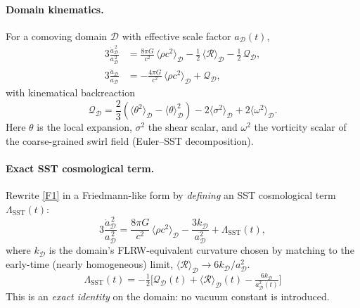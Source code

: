 \documentclass[reprint,aps,onecolumn,nofootinbib]{revtex4-2}
\begin{document}
    \paragraph{Domain kinematics.}
        For a comoving domain $\mathcal{D}$ with effective scale factor $a_\mathcal{D}(t)$,
        \begin{align}
        3\frac{\dot a_\mathcal{D}^{\,2}}{a_\mathcal{D}^{\,2}}
        &= \frac{8\pi G}{c^2}\,\langle \rho c^2 \rangle_\mathcal{D}
        - \tfrac{1}{2}\,\langle \mathcal{R} \rangle_\mathcal{D}
        - \tfrac{1}{2}\,\mathcal{Q}_\mathcal{D}, \tag{F1}\label{F1}\\
        3\frac{\ddot a_\mathcal{D}}{a_\mathcal{D}}
        &= -\frac{4\pi G}{c^2}\,\langle \rho c^2 \rangle_\mathcal{D}
        + \mathcal{Q}_\mathcal{D}, \tag{F2}\label{F2}
        \end{align}
        with kinematical backreaction
        \[
            \mathcal{Q}_\mathcal{D}
            = \frac{2}{3}\!\left(\langle \theta^{2}\rangle_\mathcal{D}-\langle \theta\rangle_\mathcal{D}^{2}\right)
            - 2\langle \sigma^{2}\rangle_\mathcal{D}
            + 2\langle \omega^{2}\rangle_\mathcal{D}.
        \]
        Here $\theta$ is the local expansion, $\sigma^2$ the shear scalar, and $\omega^2$ the vorticity scalar of the coarse-grained swirl field (Euler–SST decomposition).

    \paragraph{Exact SST cosmological term.}
        Rewrite \eqref{F1} in a Friedmann-like form by \emph{defining} an SST cosmological term $\Lambda_{\!\mathrm{SST}}(t)$:
        \[
            3\frac{\dot a_\mathcal{D}^{\,2}}{a_\mathcal{D}^{\,2}}
            = \frac{8\pi G}{c^2}\,\langle \rho c^2 \rangle_\mathcal{D}
            - \frac{3k_\mathcal{D}}{a_\mathcal{D}^{2}}
            + \Lambda_{\!\mathrm{SST}}(t),
        \]
        where $k_\mathcal{D}$ is the domain’s FLRW-equivalent curvature chosen by matching to the early-time (nearly homogeneous) limit, $\langle \mathcal{R} \rangle_\mathcal{D}\to 6k_\mathcal{D}/a_\mathcal{D}^2$.
        \[
            \boxed{\;
            \Lambda_{\!\mathrm{SST}}(t)
                = -\tfrac{1}{2}\Big[\mathcal{Q}_\mathcal{D}(t)
                +\langle \mathcal{R} \rangle_\mathcal{D}(t)
                - \tfrac{6k_\mathcal{D}}{a_\mathcal{D}^{2}(t)}\Big]
                \;}
            \tag{D1}\label{D1}
        \]
        This is an \emph{exact identity} on the domain: no vacuum constant is introduced.
\end{document}
